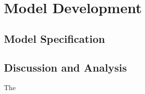 \section{Model Development}
\subsection{Model Specification}
\subsection{Discussion and Analysis}
The 